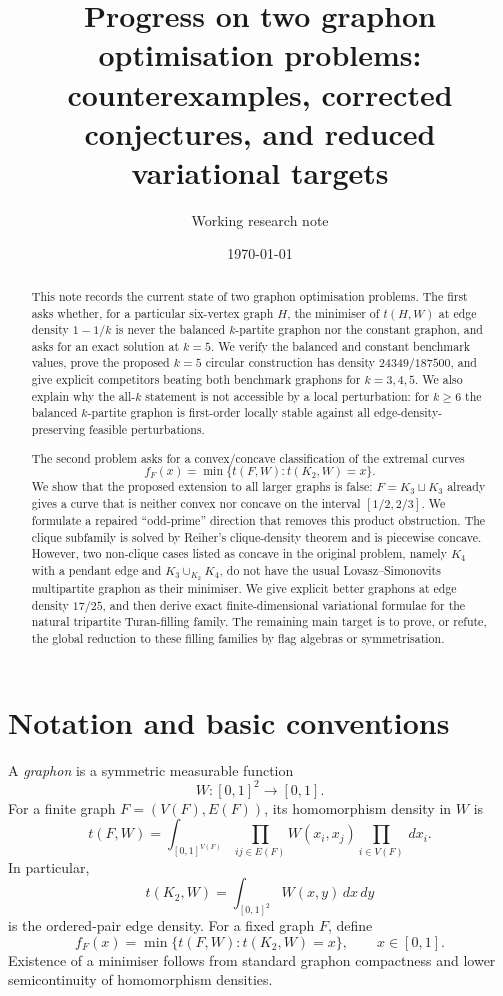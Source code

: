 \documentclass[11pt]{amsart}
\title[Progress on two graphon optimisation problems]{Progress on two graphon optimisation problems: counterexamples, corrected conjectures, and reduced variational targets}
\author{Working research note}
\date{\today}
\theoremstyle{definition}
\newcommand{\1}{\mathbf 1}
\newcommand{\dd}{\,d}
\begin{document}
\begin{abstract}
This note records the current state of two graphon optimisation problems.  The first asks whether, for a particular six-vertex graph $H$, the minimiser of $t(H,W)$ at edge density $1-1/k$ is never the balanced $k$-partite graphon nor the constant graphon, and asks for an exact solution at $k=5$.  We verify the balanced and constant benchmark values, prove the proposed $k=5$ circular construction has density $24349/187500$, and give explicit competitors beating both benchmark graphons for $k=3,4,5$.  We also explain why the all-$k$ statement is not accessible by a local perturbation: for $k\ge 6$ the balanced $k$-partite graphon is first-order locally stable against all edge-density-preserving feasible perturbations.

The second problem asks for a convex/concave classification of the extremal curves
\[
   f_F(x)=\min\{t(F,W):t(K_2,W)=x\}.
\]
We show that the proposed extension to all larger graphs is false: $F=K_3\sqcup K_3$ already gives a curve that is neither convex nor concave on the interval $[1/2,2/3]$.  We formulate a repaired ``odd-prime'' direction that removes this product obstruction.  The clique subfamily is solved by Reiher's clique-density theorem and is piecewise concave.  However, two non-clique cases listed as concave in the original problem, namely $K_4$ with a pendant edge and $K_3\cup_{K_2}K_4$, do not have the usual Lovasz--Simonovits multipartite graphon as their minimiser.  We give explicit better graphons at edge density $17/25$, and then derive exact finite-dimensional variational formulae for the natural tripartite Turan-filling family.  The remaining main target is to prove, or refute, the global reduction to these filling families by flag algebras or symmetrisation.
\end{abstract}

\maketitle

\tableofcontents

\section{Notation and basic conventions}

A \emph{graphon} is a symmetric measurable function
\[
   W:[0,1]^2\to[0,1].
\]
For a finite graph $F=(V(F),E(F))$, its homomorphism density in $W$ is
\[
   t(F,W)=\int_{[0,1]^{V(F)}}\prod_{ij\in E(F)} W(x_i,x_j)\prod_{i\in V(F)}\dd x_i.
\]
In particular,
\[
   t(K_2,W)=\int_{[0,1]^2}W(x,y)\dd x\dd y
\]
is the ordered-pair edge density.  For a fixed graph $F$, define
\[
   f_F(x)=\min\{t(F,W):t(K_2,W)=x\},\qquad x\in[0,1].
\]
Existence of a minimiser follows from standard graphon compactness and lower semicontinuity of homomorphism densities.
\end{document}
